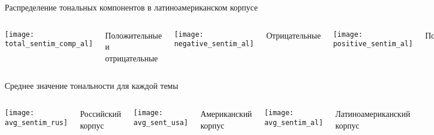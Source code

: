 \documentclass[xetex, aspectratio = 169]{beamer}
\begin{document}
\begin{frame}{Распределение тональных компонентов в латиноамериканском корпусе}
    \begin{columns}
        \centering
        \texttt{[image: total\_sentim\_comp\_al]}
        \vspace{0.3em}

        Положительные и отрицательные

        \centering
        \texttt{[image: negative\_sentim\_al]}
        \vspace{0.3em}

        Отрицательные

        \centering
        \texttt{[image: positive\_sentim\_al]}
        \vspace{0.3em}

        Положительные
    \end{columns}
\end{frame}

\begin{frame}{Среднее значение тональности для каждой темы}
    \begin{columns}
        \centering
        \texttt{[image: avg\_sentim\_rus]}
        \vspace{0.3em}

        Российский корпус

        \centering
        \texttt{[image: avg\_sent\_usa]}
        \vspace{0.3em}

        Американский корпус

        \centering
        \texttt{[image: avg\_sentim\_al]}
        \vspace{0.3em}

        Латиноамериканский корпус
    \end{columns}
\end{frame}
\end{document}
